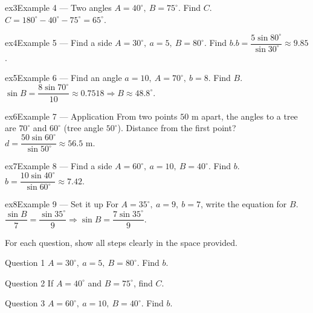 \documentclass[11pt]{article}
\begin{document}
\begin{example}{ex3}{Example 4 --- Two angles}
$A=40^\circ,\ B=75^\circ$. Find $C$.\soln $C=180^\circ-40^\circ-75^\circ=65^\circ$.
\end{example}

\begin{example}{ex4}{Example 5 --- Find a side}
$A=30^\circ,\ a=5,\ B=80^\circ$. Find $b$.\soln $b=\dfrac{5\sin80^\circ}{\sin30^\circ}\approx9.85$.
\end{example}

\begin{example}{ex5}{Example 6 --- Find an angle}
$a=10,\ A=70^\circ,\ b=8$. Find $B$.\soln $\sin B=\dfrac{8\sin70^\circ}{10}\approx0.7518\Rightarrow B\approx48.8^\circ$.
\end{example}

\begin{example}{ex6}{Example 7 --- Application}
From two points $50$ m apart, the angles to a tree are $70^\circ$ and $60^\circ$ (tree angle $50^\circ$). Distance from the first point?\soln $d=\dfrac{50\sin60^\circ}{\sin50^\circ}\approx56.5$ m.
\end{example}

\begin{example}{ex7}{Example 8 --- Find a side}
$A=60^\circ,\ a=10,\ B=40^\circ$. Find $b$.\soln $b=\dfrac{10\sin40^\circ}{\sin60^\circ}\approx7.42$.
\end{example}

\begin{example}{ex8}{Example 9 --- Set it up}
For $A=35^\circ,\ a=9,\ b=7$, write the equation for $B$.\soln $\dfrac{\sin B}{7}=\dfrac{\sin35^\circ}{9}\Rightarrow\sin B=\dfrac{7\sin35^\circ}{9}$.
\end{example}

\clearpage
{}
For each question, show all steps clearly in the space provided.

\begin{qbox}{Question 1}
$A=30^\circ,\ a=5,\ B=80^\circ$. Find $b$.\workspace{2.2cm}
\end{qbox}

\begin{qbox}{Question 2}
If $A=40^\circ$ and $B=75^\circ$, find $C$.\workspace{2.4cm}
\end{qbox}

\begin{qbox}{Question 3}
$A=60^\circ,\ a=10,\ B=40^\circ$. Find $b$.\workspace{2.2cm}
\end{qbox}
\end{document}
